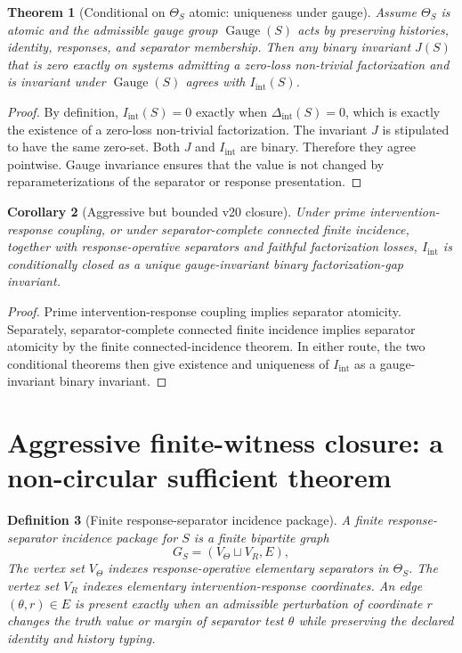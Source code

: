 \documentclass[11pt]{article}
\newtheorem{definition}{Definition}[section]
\newtheorem{theorem}[definition]{Theorem}
\newtheorem{corollary}[definition]{Corollary}
\newcommand{\QGauge}{\operatorname{Gauge}}
\newcommand{\Iint}{I_{\mathrm{int}}}
\begin{document}
\begin{theorem}[Conditional on $\Theta_S$ atomic: uniqueness under gauge]
Assume $\Theta_S$ is atomic and the admissible gauge group $\QGauge(S)$ acts by preserving histories, identity, responses, and separator membership. Then any binary invariant $J(S)$ that is zero exactly on systems admitting a zero-loss non-trivial factorization and is invariant under $\QGauge(S)$ agrees with $\Iint(S)$.
\end{theorem}

\begin{proof}
By definition, $\Iint(S)=0$ exactly when $\Delta_{\mathrm{int}}(S)=0$, which is exactly the existence of a zero-loss non-trivial factorization. The invariant $J$ is stipulated to have the same zero-set. Both $J$ and $\Iint$ are binary. Therefore they agree pointwise. Gauge invariance ensures that the value is not changed by reparameterizations of the separator or response presentation.
\end{proof}

\begin{corollary}[Aggressive but bounded v20 closure]
Under prime intervention-response coupling, or under separator-complete connected finite incidence, together with response-operative separators and faithful factorization losses, $\Iint$ is conditionally closed as a unique gauge-invariant binary factorization-gap invariant.
\end{corollary}

\begin{proof}
Prime intervention-response coupling implies separator atomicity. Separately, separator-complete connected finite incidence implies separator atomicity by the finite connected-incidence theorem. In either route, the two conditional theorems then give existence and uniqueness of $\Iint$ as a gauge-invariant binary invariant.
\end{proof}


\section{Aggressive finite-witness closure: a non-circular sufficient theorem}

\begin{definition}[Finite response-separator incidence package]
A finite response-separator incidence package for $S$ is a finite bipartite graph
\[
  G_S=(V_\Theta\sqcup V_R,E),
\]
The vertex set $V_\Theta$ indexes response-operative elementary separators in $\Theta_S$. The vertex set $V_R$ indexes elementary intervention-response coordinates. An edge $(\theta,r)\in E$ is present exactly when an admissible perturbation of coordinate $r$ changes the truth value or margin of separator test $\theta$ while preserving the declared identity and history typing.
\end{definition}
\end{document}
